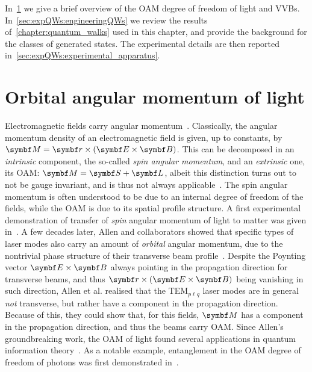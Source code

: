 In~\cref{sec:expQWs:OAMintro} we give a brief overview of the \ac{OAM} degree of freedom of light and \acp{VVB}.
In~\cref{sec:expQWs:engineeringQWs} we review the results of~\cref{chapter:quantum_walks} used in this chapter, and provide the background for the classes of generated states. The experimental details are then reported in~\cref{sec:expQWs:experimental_apparatus}. 


\section{Orbital angular momentum of light}
\label{sec:expQWs:OAMintro}

Electromagnetic fields carry angular momentum~\cite{jackson1999classical}.
Classically, the angular momentum density of an electromagnetic field is given, up to constants, by
$\bs M =\bs r\times(\bs E\times \bs B)$. This can be decomposed in an \emph{intrinsic} component, the so-called \emph{spin angular momentum}, and an \emph{extrinsic} one, its \ac{OAM}: $\bs M=\bs S+\bs L$, albeit this distinction turns out to not be gauge invariant, and is thus not always applicable~\cite{ohanian1986what,cameron2015azimuthal}.
The spin angular momentum is often understood to be due to an internal degree of freedom of the fields, while the OAM is due to its spatial profile structure.
A first experimental demonstration of transfer of \emph{spin} angular momentum of light to matter was given in~\cite{beth1936mechanical}. A few decades later, Allen and collaborators showed that specific types of laser modes also carry an amount of \emph{orbital} angular momentum, due to the nontrivial phase structure of their transverse beam profile~\cite{allen1992orbital}.
Despite the Poynting vector $\bs E\times \bs B$ always pointing in the propagation direction for transverse beams, and thus $\bs r\times(\bs E\times\bs B)$ being vanishing in such direction, Allen et al. realised that the TEM$_{p\ell q}$ laser modes are in general \emph{not} transverse, but rather have a component in the propagation direction. Because of this, they could show that, for this fields, $\bs M$ has a component in the propagation direction, and thus the beams carry OAM.
Since Allen's groundbreaking work, the OAM of light found several applications in quantum information theory~\cite{allen1999orbital,padgett2004lights,barnett2007orbital,franke-arnold2008advances,yao2011orbital,padgett2017orbital,erhard2017twisted}. As a notable example, entanglement in the OAM degree of freedom of photons was first demonstrated in~\cite{mair2001entanglement}.

